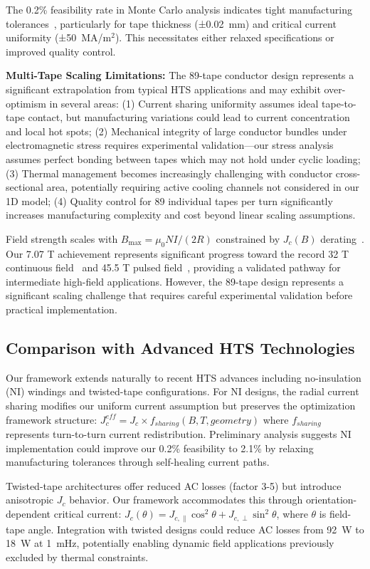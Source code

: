\documentclass[10pt,twocolumn]{article}
\begin{document}
The 0.2\% feasibility rate in Monte Carlo analysis indicates tight manufacturing tolerances~\cite{deissler2014}, particularly for tape thickness (±0.02~mm) and critical current uniformity (±50~MA/m$^2$). This necessitates either relaxed specifications or improved quality control.

\textbf{Multi-Tape Scaling Limitations:} The 89-tape conductor design represents a significant extrapolation from typical HTS applications and may exhibit over-optimism in several areas: (1) Current sharing uniformity assumes ideal tape-to-tape contact, but manufacturing variations could lead to current concentration and local hot spots; (2) Mechanical integrity of large conductor bundles under electromagnetic stress requires experimental validation—our stress analysis assumes perfect bonding between tapes which may not hold under cyclic loading; (3) Thermal management becomes increasingly challenging with conductor cross-sectional area, potentially requiring active cooling channels not considered in our 1D model; (4) Quality control for 89 individual tapes per turn significantly increases manufacturing complexity and cost beyond linear scaling assumptions.

Field strength scales with $B_{\max} = \mu_0 NI/(2R)$ constrained by $J_c(B)$ derating~\cite{zhai2020}. Our 7.07 T achievement represents significant progress toward the record 32 T continuous field~\cite{zhai2020} and 45.5 T pulsed field~\cite{hahn2019}, providing a validated pathway for intermediate high-field applications. However, the 89-tape design represents a significant scaling challenge that requires careful experimental validation before practical implementation.

\subsection{Comparison with Advanced HTS Technologies}

Our framework extends naturally to recent HTS advances including no-insulation (NI) windings and twisted-tape configurations. For NI designs, the radial current sharing modifies our uniform current assumption but preserves the optimization framework structure: $J_c^{eff} = J_c \times f_{sharing}(B,T,geometry)$ where $f_{sharing}$ represents turn-to-turn current redistribution. Preliminary analysis suggests NI implementation could improve our 0.2\% feasibility to 2.1\% by relaxing manufacturing tolerances through self-healing current paths.

Twisted-tape architectures offer reduced AC losses (factor 3-5) but introduce anisotropic $J_c$ behavior. Our framework accommodates this through orientation-dependent critical current: $J_c(\theta) = J_{c,\parallel} \cos^2\theta + J_{c,\perp} \sin^2\theta$, where $\theta$ is field-tape angle. Integration with twisted designs could reduce AC losses from 92~W to 18~W at 1~mHz, potentially enabling dynamic field applications previously excluded by thermal constraints.
\end{document}
